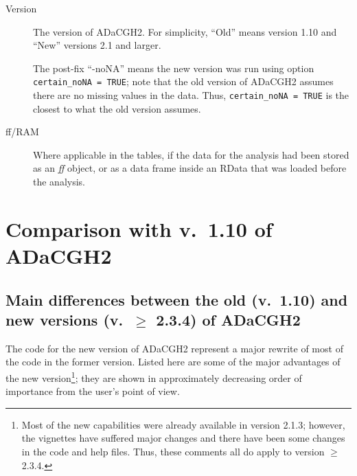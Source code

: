 \documentclass[a4paper,11pt]{article}
\begin{document}
\begin{description}
\item[Version] The version of ADaCGH2. For simplicity, ``Old'' means
  version 1.10 and ``New'' versions 2.1 and larger.
  
  The post-fix ``-noNA'' means the new version was run using option
  \texttt{certain\_noNA = TRUE}; note that the old version of ADaCGH2
  assumes there are no missing values in the data. Thus,
  \texttt{certain\_noNA = TRUE} is the closest to what the old version assumes. 

\item[ff/RAM] Where applicable in the tables, if the data for the analysis
  had been stored as an \textit{ff} object, or as a data frame inside an
  RData that was loaded before the analysis.
  

\end{description}



\clearpage
\section{Comparison with v.\ 1.10 of ADaCGH2}

\subsection{Main differences between the old (v.\ 1.10) and new versions
  (v.\ $\ge$ 2.3.4) of ADaCGH2}


The code for the new version of ADaCGH2 represent a major rewrite of most
of the code in the former version. Listed here are some of the major
advantages of the new version\footnote{Most of the new capabilities were
  already available in version 2.1.3; however, the vignettes have suffered
  major changes and there have been some changes in the code and help
  files. Thus, these comments all do apply to version $\ge$ 2.3.4.}; they
are shown in approximately decreasing order of importance from the user's
point of view.
\end{document}
